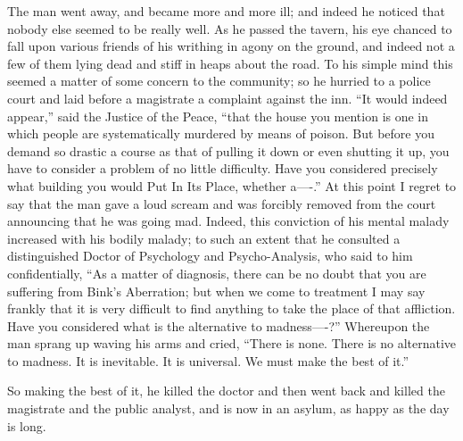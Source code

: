 \documentclass{book}
\begin{document}
The man went away, and became more and more ill; and indeed he noticed that nobody else seemed to be really well. As he passed the tavern, his eye chanced to fall upon various friends of his writhing in agony on the ground, and indeed not a few of them lying dead and stiff in heaps about the road. To his simple mind this seemed a matter of some concern to the community; so he hurried to a police court and laid before a magistrate a complaint against the inn. “It would indeed appear,” said the Justice of the Peace, “that the house you mention is one in which people are systematically murdered by means of poison. But before you demand so drastic a course as that of pulling it down or even shutting it up, you have to consider a problem of no little difficulty. Have you considered precisely what building you would Put In Its Place, whether a—-.” At this point I regret to say that the man gave a loud scream and was forcibly removed from the court announcing that he was going mad. Indeed, this conviction of his mental malady increased with his bodily malady; to such an extent that he consulted a distinguished Doctor of Psychology and Psycho-Analysis, who said to him confidentially, “As a matter of diagnosis, there can be no doubt that you are suffering from Bink’s Aberration; but when we come to treatment I may say frankly that it is very difficult to find anything to take the place of that affliction. Have you considered what is the alternative to madness—-?” Whereupon the man sprang up waving his arms and cried, “There is none. There is no alternative to madness. It is inevitable. It is universal. We must make the best of it.”

So making the best of it, he killed the doctor and then went back and killed the magistrate and the public analyst, and is now in an asylum, as happy as the day is long.
\end{document}
